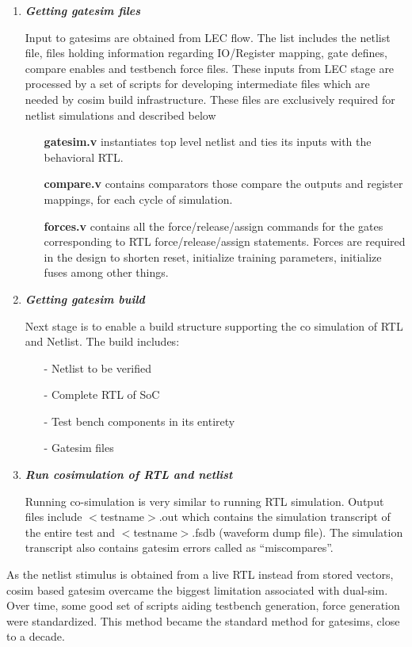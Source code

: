 \begin{enumerate}
	\item \emph{\bf Getting gatesim files}

	Input to gatesims are obtained from LEC flow. The list includes the netlist file, files holding information regarding IO/Register mapping, gate defines, compare enables and testbench force files. These inputs from LEC stage are processed by a set of scripts for developing intermediate files which are needed by cosim build infrastructure. These files are exclusively required for netlist simulations and described below
	\begin{itemize}
		\item[{\bf gatesim.v}] instantiates top level netlist and ties its inputs with the behavioral RTL.
		\item[{\bf compare.v}] contains comparators those compare the outputs and register mappings, for each cycle of simulation.
		\item[{\bf forces.v}] contains all the force/release/assign commands for the gates corresponding to RTL force/release/assign statements. Forces are required in the design to shorten reset, initialize training parameters, initialize fuses among other things.
	\end{itemize}

	\item \emph{\bf Getting gatesim build} 

	Next stage is to enable a build structure supporting the co simulation of RTL and Netlist. The build includes:
	\begin{itemize}
		\item[-]Netlist to be verified
		\item[-]Complete RTL of SoC
		\item[-]Test bench components in its entirety
		\item[-]Gatesim files
	\end{itemize}

	\item \emph{\bf Run cosimulation of RTL and netlist}

	Running co-simulation is very similar to running RTL simulation. Output files include $<$testname$>$.out which contains the simulation transcript of the entire test and $<$testname$>$.fsdb (waveform dump file). The simulation transcript also contains gatesim errors called as ``miscompares''.
\end{enumerate}


As the netlist stimulus is obtained from a live RTL instead from stored vectors, cosim based gatesim overcame the biggest limitation associated with dual-sim. Over time, some good set of scripts aiding testbench generation, force generation were standardized. This method became the standard method for gatesims, close to a decade.

